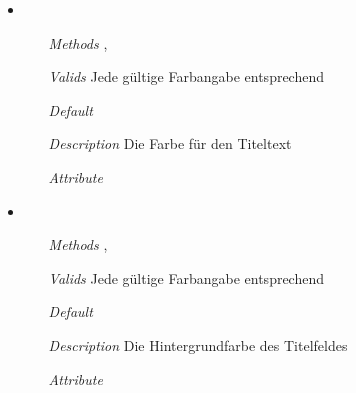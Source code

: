 \begin{itemize}
\item {}
\begin{enumerate}
\item[\textit{Methods}] 
,
\item[\textit{Valids}] Jede g\"ultige Farbangabe entsprechend
\item[\textit{Default}] 
\item[\textit{Description}] Die Farbe f\"ur den Titeltext
\item[\textit{Attribute}] 
\end{enumerate}

\item {}
\begin{enumerate}
\item[\textit{Methods}] 
,
\item[\textit{Valids}] Jede g\"ultige Farbangabe entsprechend
\item[\textit{Default}] 
\item[\textit{Description}] Die Hintergrundfarbe des 
Titelfeldes
\item[\textit{Attribute}] 
\end{enumerate}

\end{itemize}


\newpage

